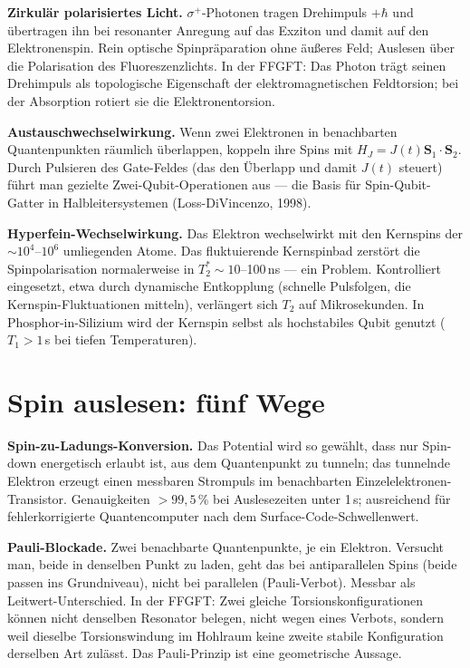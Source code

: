 \textbf{Zirkulär polarisiertes Licht.} $\sigma^+$-Photonen tragen
Drehimpuls $+\hbar$ und übertragen ihn bei resonanter Anregung auf das
Exziton und damit auf den Elektronenspin. Rein optische Spinpräparation
ohne äußeres Feld; Auslesen über die Polarisation des Fluoreszenzlichts.
In der FFGFT: Das Photon trägt seinen Drehimpuls als topologische
Eigenschaft der elektromagnetischen Feldtorsion; bei der Absorption
rotiert sie die Elektronentorsion.

\textbf{Austauschwechselwirkung.} Wenn zwei Elektronen in benachbarten
Quantenpunkten räumlich überlappen, koppeln ihre Spins mit $H_J =
J(t)\mathbf{S}_1\cdot\mathbf{S}_2$. Durch Pulsieren des Gate-Feldes
(das den Überlapp und damit $J(t)$ steuert) führt man gezielte
Zwei-Qubit-Operationen aus --- die Basis für Spin-Qubit-Gatter in
Halbleitersystemen (Loss-DiVincenzo, 1998).

\textbf{Hyperfein-Wechselwirkung.} Das Elektron wechselwirkt mit den
Kernspins der $\sim10^4$--$10^6$ umliegenden Atome. Das fluktuierende
Kernspinbad zerstört die Spinpolarisation normalerweise in $T_2^*\sim
10$--100\,ns --- ein Problem. Kontrolliert eingesetzt, etwa durch
dynamische Entkopplung (schnelle Pulsfolgen, die Kernspin-Fluktuationen
mitteln), verlängert sich $T_2$ auf Mikrosekunden. In Phosphor-in-Silizium
wird der Kernspin selbst als hochstabiles Qubit genutzt
($T_1 > 1$\,s bei tiefen Temperaturen).

\section{Spin auslesen: fünf Wege}

\textbf{Spin-zu-Ladungs-Konversion.} Das Potential wird so gewählt,
dass nur Spin-down energetisch erlaubt ist, aus dem Quantenpunkt zu
tunneln; das tunnelnde Elektron erzeugt einen messbaren Strompuls im
benachbarten Einzelelektronen-Transistor. Genauigkeiten $>99{,}5\,\%$ bei
Auslesezeiten unter 1\,\textmu{}s; ausreichend für fehlerkorrigierte
Quantencomputer nach dem Surface-Code-Schwellenwert.

\textbf{Pauli-Blockade.} Zwei benachbarte Quantenpunkte, je ein Elektron.
Versucht man, beide in denselben Punkt zu laden, geht das bei
antiparallelen Spins (beide passen ins Grundniveau), nicht bei parallelen
(Pauli-Verbot). Messbar als Leitwert-Unterschied. In der FFGFT: Zwei
gleiche Torsionskonfigurationen können nicht denselben Resonator belegen,
nicht wegen eines Verbots, sondern weil dieselbe Torsionswindung im
Hohlraum keine zweite stabile Konfiguration derselben Art zulässt. Das
Pauli-Prinzip ist eine geometrische Aussage.

